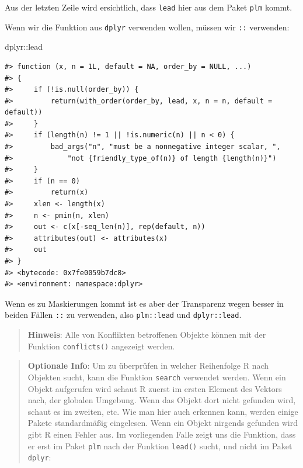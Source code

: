 \documentclass[]{tufte-book}
\newenvironment{Shaded}{}{}
\newcommand{\OperatorTok}[1]{\textcolor[rgb]{0.40,0.40,0.40}{#1}}
\newcommand{\NormalTok}[1]{#1}
\begin{document}
Aus der letzten Zeile wird ersichtlich, dass \texttt{lead} hier aus dem
Paket \texttt{plm} kommt.

Wenn wir die Funktion aus \texttt{dplyr} verwenden wollen, müssen wir
\texttt{::} verwenden:

\begin{Shaded}
\begin{Highlighting}[]
\NormalTok{dplyr}\OperatorTok{::}\NormalTok{lead}
\end{Highlighting}
\end{Shaded}

\begin{verbatim}
#> function (x, n = 1L, default = NA, order_by = NULL, ...) 
#> {
#>     if (!is.null(order_by)) {
#>         return(with_order(order_by, lead, x, n = n, default = default))
#>     }
#>     if (length(n) != 1 || !is.numeric(n) || n < 0) {
#>         bad_args("n", "must be a nonnegative integer scalar, ", 
#>             "not {friendly_type_of(n)} of length {length(n)}")
#>     }
#>     if (n == 0) 
#>         return(x)
#>     xlen <- length(x)
#>     n <- pmin(n, xlen)
#>     out <- c(x[-seq_len(n)], rep(default, n))
#>     attributes(out) <- attributes(x)
#>     out
#> }
#> <bytecode: 0x7fe0059b7dc8>
#> <environment: namespace:dplyr>
\end{verbatim}

Wenn es zu Maskierungen kommt ist es aber der Transparenz wegen besser
in beiden Fällen \texttt{::} zu verwenden, also \texttt{plm::lead} und
\texttt{dplyr::lead}.

\begin{quote}
\textbf{Hinweis}: Alle von Konflikten betroffenen Objekte können mit der
Funktion \texttt{conflicts()} angezeigt werden.
\end{quote}

\begin{quote}
\textbf{Optionale Info}: Um zu überprüfen in welcher Reihenfolge R nach
Objekten sucht, kann die Funktion \texttt{search} verwendet werden. Wenn
ein Objekt aufgerufen wird schaut R zuerst im ersten Element des Vektors
nach, der globalen Umgebung. Wenn das Objekt dort nicht gefunden wird,
schaut es im zweiten, etc. Wie man hier auch erkennen kann, werden
einige Pakete standardmäßig eingelesen. Wenn ein Objekt nirgends
gefunden wird gibt R einen Fehler aus. Im vorliegenden Falle zeigt uns
die Funktion, dass er erst im Paket \texttt{plm} nach der Funktion
\texttt{lead()} sucht, und nicht im Paket \texttt{dplyr}:
\end{quote}
\end{document}
